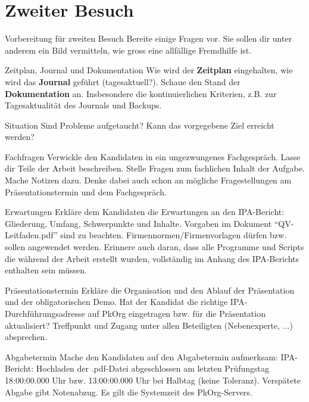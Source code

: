 \section{Zweiter Besuch}
\begin{taskitem}{Vorbereitung für zweiten Besuch}
  Bereite einige Fragen vor. Sie sollen dir unter anderem ein Bild vermitteln, wie gross eine allfällige Fremdhilfe ist.
\end{taskitem}
\begin{taskitem}{Zeitplan, Journal und Dokumentation}
  Wie wird der \textbf{Zeitplan} eingehalten, wie wird das \textbf{Journal} geführt (tagesaktuell?). Schaue den Stand der \textbf{Dokumentation} an. Insbesondere die kontinuierlichen Kriterien, z.B. zur Tagesaktualität des Journals und Backups.
\end{taskitem}
\begin{taskitem}{Situation}
  Sind Probleme aufgetaucht? Kann das vorgegebene Ziel erreicht werden?
\end{taskitem}
\begin{taskitem}{Fachfragen}
  Verwickle den Kandidaten in ein ungezwungenes Fachgespräch. Lasse dir Teile der Arbeit beschreiben. Stelle Fragen zum fachlichen Inhalt der Aufgabe. Mache Notizen dazu. Denke dabei auch schon an mögliche Fragestellungen am Präsentationstermin und dem Fachgespräch.
\end{taskitem}
\begin{taskitem}{Erwartungen}
  Erkläre dem Kandidaten die Erwartungen an den IPA-Bericht: Gliederung, Umfang, Schwerpunkte und Inhalte. Vorgaben im Dokument \enquote{QV-Leitfaden.pdf} sind zu beachten. Firmennormen/Firmenvorlagen dürfen bzw. sollen angewendet werden. Erinnere auch daran, dass alle Programme und Scripts die während der Arbeit erstellt wurden, vollständig im Anhang des IPA-Berichts enthalten sein müssen.
\end{taskitem}
\begin{taskitem}{Präsentationstermin}
  Erkläre die Organisation und den Ablauf der Präsentation und der obligatorischen Demo. Hat der Kandidat die richtige IPA-Durchführungsadresse auf PkOrg eingetragen bzw. für die Präsentation aktualisiert? Treffpunkt und Zugang unter allen Beteiligten (Nebenexperte, ...) absprechen.
\end{taskitem}
\begin{taskitem}{Abgabetermin}
  Mache den Kandidaten auf den Abgabetermin aufmerksam: IPA-Bericht: Hochladen der .pdf-Datei abgeschlossen am letzten Prüfungstag 18:00:00.000 Uhr bzw. 13:00:00.000 Uhr bei Halbtag (keine Toleranz). Verspätete Abgabe gibt Notenabzug. Es gilt die Systemzeit des PkOrg-Servers.
\end{taskitem}
